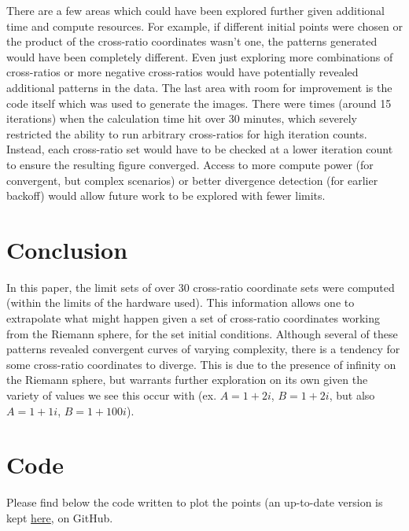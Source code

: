 \documentclass[12pt,a4paper,reqno,parskip=full]{amsart}
\numberwithin{equation}{section}
\theoremstyle{plain}
\theoremstyle{definition}
\begin{document}
There are a few areas which could have been explored further given additional time and compute resources. For example, if different initial points were chosen or the product of the cross-ratio coordinates wasn't one, the patterns generated would have been completely different. Even just exploring more combinations of cross-ratios or more negative cross-ratios would have potentially revealed additional patterns in the data. The last area with room for improvement is the code itself which was used to generate the images. There were times (around 15 iterations) when the calculation time hit over 30 minutes, which severely restricted the ability to run arbitrary cross-ratios for high iteration counts. Instead, each cross-ratio set would have to be checked at a lower iteration count to ensure the resulting figure converged. Access to more compute power (for convergent, but complex scenarios) or better divergence detection (for earlier backoff) would allow future work to be explored with fewer limits.

\section{Conclusion}

In this paper, the limit sets of over 30 cross-ratio coordinate sets were computed (within the limits of the hardware used). This information allows one to extrapolate what might happen given a set of cross-ratio coordinates working from the Riemann sphere, for the set initial conditions. Although several of these patterns revealed convergent curves of varying complexity, there is a tendency for some cross-ratio coordinates to diverge. This is due to the presence of infinity on the Riemann sphere, but warrants further exploration on its own given the variety of values we see this occur with (ex. $A=1+2i$, $B=1+2i$, but also $A=1+1i$, $B=1+100i$). 



\newpage
\appendix
\appendixpage
\addappheadtotoc

\section{Code}
Please find below the code written to plot the points (an up-to-date version is kept \href{https://github.com/scerbone121/ma499report/blob/main/circles3.py}{here}, on GitHub.
\end{document}
